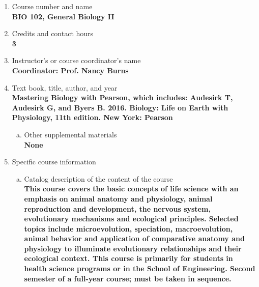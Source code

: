 \label{BIO102}  %
\begin{enumerate}[1.]
\item Course number and name\\
  {\bfseries
    BIO 102, General Biology II
  }

\item Credits and contact hours\\
  {\bfseries
    3
  }

\item Instructor's or course coordinator's name\\
  {\bfseries
    Coordinator: Prof. Nancy Burns
  }

\item Text book, title, author, and year\\
  {\bfseries
    Mastering Biology with Pearson, which includes: Audesirk T, Audesirk G, and Byers B. 2016. Biology: Life on Earth with Physiology, 11th edition.  New York: Pearson
  }
\begin{enumerate}[a.]
\item Other supplemental materials\\
  {\bfseries
   None
  }
\end{enumerate}

\item Specific course information
\begin{enumerate}[a.]
\item Catalog description of the content of the course\\
  {\bfseries
This course covers the basic concepts of life science with an emphasis on animal anatomy and physiology, animal reproduction and development, the nervous system, evolutionary mechanisms and ecological principles. Selected topics include microevolution, speciation, macroevolution, animal behavior and application of comparative anatomy and physiology to illuminate evolutionary relationships and their ecological context. This course is primarily for students in health science programs or in the School of Engineering. Second semester of a full-year course; must be taken in sequence.
  }


\end{enumerate}
\end{enumerate}
